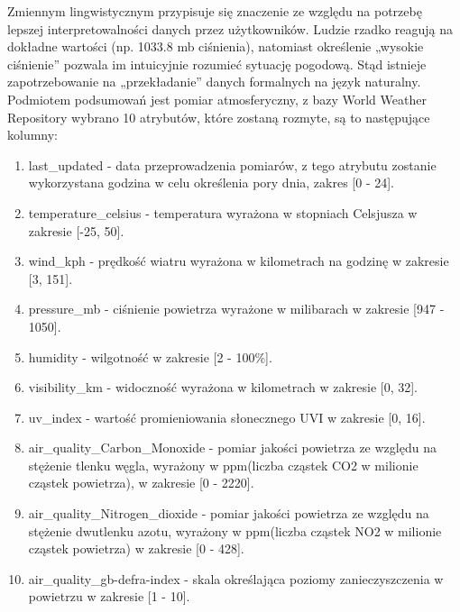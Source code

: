 \documentclass{article}
\begin{document}
Zmiennym lingwistycznym przypisuje się znaczenie ze względu na potrzebę lepszej interpretowalności danych przez użytkowników. Ludzie rzadko reagują na dokładne wartości (np. 1033.8 mb ciśnienia), natomiast określenie „wysokie ciśnienie” pozwala im intuicyjnie rozumieć sytuację pogodową. Stąd istnieje zapotrzebowanie na „przekładanie” danych formalnych na język naturalny. \\
Podmiotem podsumowań jest pomiar atmosferyczny, z bazy World Weather Repository wybrano 10 atrybutów, które zostaną rozmyte, są to następujące kolumny:
\begin{enumerate}
    \item last\_updated - data przeprowadzenia pomiarów, z tego atrybutu zostanie wykorzystana godzina w celu określenia pory dnia, zakres [0 - 24]. 
    \item temperature\_celsius - temperatura wyrażona w stopniach Celsjusza w zakresie [-25, 50].
    \item wind\_kph - prędkość wiatru wyrażona w kilometrach na godzinę w zakresie [3, 151]. 
    \item pressure\_mb - ciśnienie powietrza wyrażone w milibarach w zakresie [947 - 1050]. 
    \item humidity - wilgotność w zakresie [2 - 100\%].
    \item visibility\_km - widoczność wyrażona w kilometrach w zakresie [0, 32].
    \item uv\_index - wartość promieniowania słonecznego UVI w zakresie [0, 16].
    \item air\_quality\_Carbon\_Monoxide - pomiar jakości powietrza ze względu na stężenie tlenku węgla, wyrażony w ppm(liczba cząstek CO2 w milionie cząstek powietrza), w zakresie [0 - 2220].
    \item air\_quality\_Nitrogen\_dioxide - pomiar jakości powietrza ze względu na stężenie dwutlenku azotu, wyrażony w ppm(liczba cząstek NO2 w milionie cząstek powietrza) w zakresie [0 - 428].
    \item air\_quality\_gb-defra-index - skala określająca poziomy zanieczyszczenia w powietrzu w zakresie [1 - 10].

    
\end{enumerate}
\end{document}
